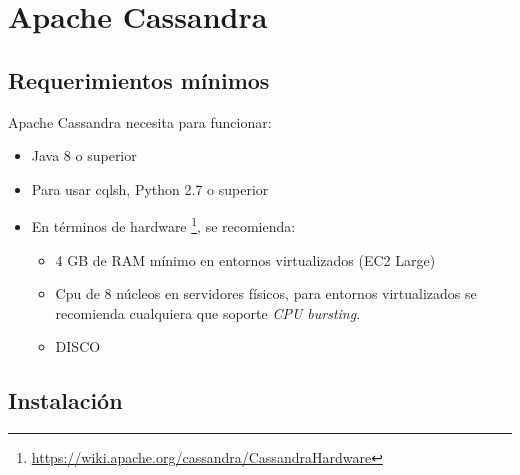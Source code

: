 \section{Apache Cassandra}
\label{sec:ovirt_install}

\subsection{Requerimientos mínimos}
\label{subsec:minreqs}

Apache Cassandra necesita para funcionar:

\begin{itemize}
  \item Java 8 o superior
  \item Para usar cqlsh, Python 2.7 o superior
  \item En términos de hardware \footnote{\url{https://wiki.apache.org/cassandra/CassandraHardware}}, se recomienda:
    \begin{itemize}
      \item 4 GB de RAM mínimo en entornos virtualizados (EC2 Large) 
      \item Cpu de 8 núcleos en servidores físicos, para entornos virtualizados
        se recomienda cualquiera que soporte \emph{CPU bursting}.
      \item DISCO
    \end{itemize}
\end{itemize}



\subsection{Instalación}
\label{subsec:instalación}

